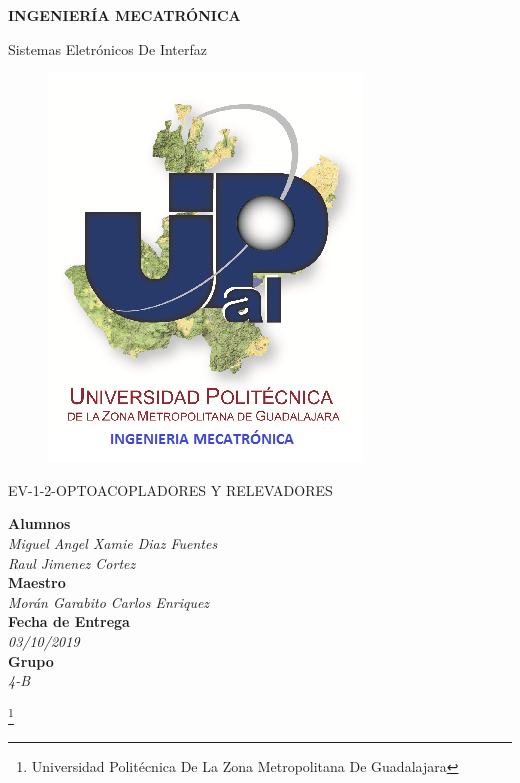 \documentclass[11pt,a4paper]{article}
\author{Miguel Angel Xamie Diaz Fuentes}
\begin{document}
\begin{center}
\begin{LARGE}
\textbf{INGENIERÍA MECATRÓNICA}\\
\end{LARGE}
{\large Sistemas Eletrónicos De Interfaz}\\
\begin{figure}[hbtp]
\centering
\includegraphics[scale=0.80]{UPZMG_Mecatr_nica.png}
\end{figure} 
\begin{center}
\begin{LARGE}
EV-1-2-OPTOACOPLADORES Y RELEVADORES
\end{LARGE}
\end{center}

\begin{Large}
\textbf{Alumnos}
\\\textit{Miguel Angel Xamie Diaz Fuentes\\Raul Jimenez Cortez}
\textbf{\\Maestro}
\\\textit{Morán Garabito Carlos Enriquez}
\textbf{\\Fecha de Entrega}
\\\textit{03/10/2019}
\textbf{\\Grupo}
\\\textit{4-B}
\end{Large}

\end{center}

\footnote{Universidad Politécnica De La Zona Metropolitana De Guadalajara} 
\end{document}
